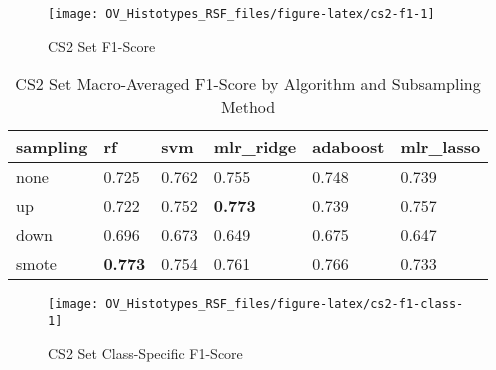 \documentclass[
]{report}
\begin{document}
\begin{figure}[H]

{\centering \texttt{[image: OV\_Histotypes\_RSF\_files/figure-latex/cs2-f1-1]} 

}

\caption{CS2 Set F1-Score}\label{fig:cs2-f1}
\end{figure}

\begin{table}

\caption{\label{tab:cs2-f1-table}CS2 Set Macro-Averaged F1-Score by Algorithm and Subsampling Method}
\centering
\begin{tabular}[t]{l|l|l|l|l|l}
\hline
sampling & rf & svm & mlr\_ridge & adaboost & mlr\_lasso\\
\hline
none & 0.725 & 0.762 & 0.755 & 0.748 & 0.739\\
\hline
up & 0.722 & 0.752 & \textbf{0.773} & 0.739 & 0.757\\
\hline
down & 0.696 & 0.673 & 0.649 & 0.675 & 0.647\\
\hline
smote & \textbf{0.773} & 0.754 & 0.761 & 0.766 & 0.733\\
\hline
\end{tabular}
\end{table}

\begin{figure}[H]

{\centering \texttt{[image: OV\_Histotypes\_RSF\_files/figure-latex/cs2-f1-class-1]} 

}

\caption{CS2 Set Class-Specific F1-Score}\label{fig:cs2-f1-class}
\end{figure}
\end{document}
